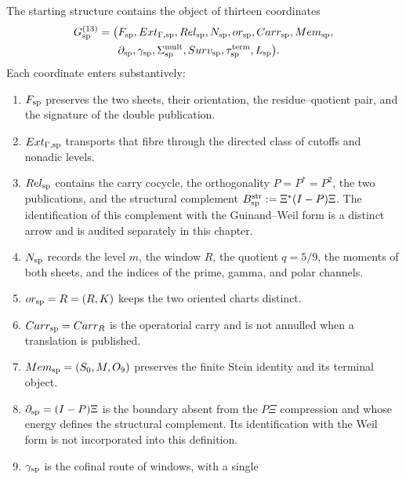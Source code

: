 The starting structure contains the object of thirteen coordinates
\begin{equation}\label{eq:pdf2-rh-res-sp-completa}
\begin{aligned}
 \mathfrak G_{\rm sp}^{(13)}=\bigl(&
 \mathcal F_{\rm sp},
 \operatorname{Ext}_{\Gamma,{\rm sp}},
 \operatorname{Rel}_{\rm sp},
 \mathcal N_{\rm sp},
 \operatorname{or}_{\rm sp},
 \operatorname{Carr}_{\rm sp},
 \operatorname{Mem}_{\rm sp},\\
 &\partial_{\rm sp},
 \gamma_{\rm sp},
 \Sigma_{\rm sp}^{\rm mult},
 \operatorname{Surv}_{\rm sp},
 \tau_{\rm sp}^{\rm term},
 \mathcal L_{\rm sp}\bigr).
\end{aligned}
\end{equation}
Each coordinate enters substantively:
\begin{enumerate}
 \item \(\mathcal F_{\rm sp}\) preserves the two sheets, their orientation, the
 residue--quotient pair, and the signature of the double publication.
 \item \(\operatorname{Ext}_{\Gamma,{\rm sp}}\) transports that fibre through the
 directed class of cutoffs and nonadic levels.
    \item \(\operatorname{Rel}_{\rm sp}\) contains the carry cocycle, the
    orthogonality \(P=P^*=P^2\), the two publications, and the structural
    complement \(B_{\rm sp}^{\rm str}:=\Xi^*(I-P)\Xi\). The identification
    of this complement with the Guinand--Weil form is a distinct arrow
    and is audited separately in this chapter.
 \item \(\mathcal N_{\rm sp}\) records the level \(m\), the window \(R\),
 the quotient \(q=5/9\), the moments of both sheets, and the indices of the
 prime, gamma, and polar channels.
 \item \(\operatorname{or}_{\rm sp}=\widehat R=(R,K)\) keeps the two oriented
 charts distinct.
 \item \(\operatorname{Carr}_{\rm sp}=\operatorname{Carr}_R\) is the
 operatorial carry and is not annulled when a translation is published.
 \item \(\operatorname{Mem}_{\rm sp}=(S_0,M,\mathcal O_9)\) preserves the
 finite Stein identity and its terminal object.
 \item \(\partial_{\rm sp}=(I-P)\Xi\) is the boundary absent from the
 \(P\Xi\) compression and whose energy defines the structural complement. Its
 identification with the Weil form is not incorporated into this definition.
 \item \(\gamma_{\rm sp}\) is the cofinal route of windows, with a single

\end{enumerate}
